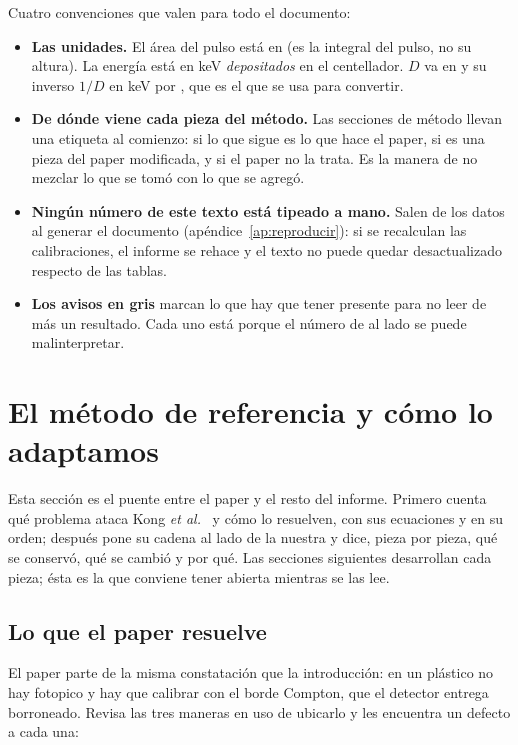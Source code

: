 \documentclass[11pt,a4paper]{article}
\begin{document}
\bigskip
\noindent
Cuatro convenciones que valen para todo el documento:

\begin{itemize}
\item \textbf{Las unidades.} El área del pulso está en \mVns{} (es la
      integral del pulso, no su altura). La energía está en keV
      \emph{depositados} en el centellador. $D$ va en \DkeV{} y su inverso
      $1/D$ en keV por \mVns, que es el que se usa para convertir.
\item \textbf{De dónde viene cada pieza del método.} Las secciones de método
      llevan una etiqueta al comienzo: \enpaper{} si lo que sigue es lo que
      hace el paper, \adaptado{} si es una pieza del paper modificada, y
      \propio{} si el paper no la trata. Es la manera de no mezclar lo que se
      tomó con lo que se agregó.
\item \textbf{Ningún número de este texto está tipeado a mano.} Salen de los
      datos al generar el documento (apéndice~\ref{ap:reproducir}): si se
      recalculan las calibraciones, el informe se rehace y el texto no puede
      quedar desactualizado respecto de las tablas.
\item \textbf{Los avisos en gris} marcan lo que hay que tener presente para
      no leer de más un resultado. Cada uno está porque el número de al lado
      se puede malinterpretar.
\end{itemize}

\section{El método de referencia y cómo lo adaptamos}
\label{sec:metodoref}

Esta sección es el puente entre el paper y el resto del informe. Primero
cuenta qué problema ataca Kong \emph{et al.}~\cite{kong2025} y cómo lo
resuelven, con sus ecuaciones y en su orden; después pone su cadena al lado
de la nuestra y dice, pieza por pieza, qué se conservó, qué se cambió y por
qué. Las secciones siguientes desarrollan cada pieza; ésta es la que conviene
tener abierta mientras se las lee.

\subsection{Lo que el paper resuelve}
\enpaper

El paper parte de la misma constatación que la introducción: en un plástico
no hay fotopico y hay que calibrar con el borde Compton, que el detector
entrega borroneado. Revisa las tres maneras en uso de ubicarlo y les
encuentra un defecto a cada una:
\end{document}
